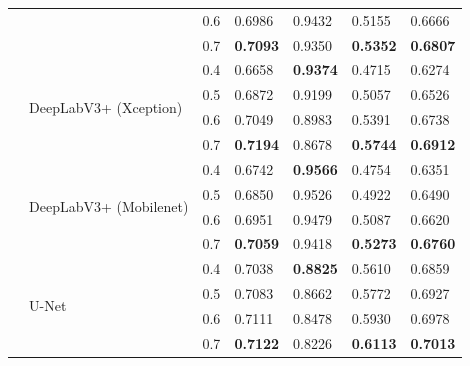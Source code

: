 \documentclass[journal]{IEEEtran}
\begin{document}
\begin{table}[t]
\begin{tabular}{p{1.5cm}p{3.5cm}p{1cm}p{1cm}p{1cm}p{1cm}p{1cm}}
        &                                               & 0.6      & 0.6986           & 0.9432          & 0.5155          & 0.6666             \\
        &                                               & 0.7      & \textbf{0.7093}  & 0.9350          & \textbf{0.5352} & \textbf{0.6807}    \\
        \cmidrule{2-7}
        & \multirow{4}{3.5cm}{DeepLabV3+ (Xception)}    & 0.4      & 0.6658           & \textbf{0.9374} & 0.4715          & 0.6274             \\
        &                                               & 0.5      & 0.6872           & 0.9199          & 0.5057          & 0.6526             \\
        &                                               & 0.6      & 0.7049           & 0.8983          & 0.5391          & 0.6738             \\
        &                                               & 0.7      & \textbf{0.7194}  & 0.8678          & \textbf{0.5744} & \textbf{0.6912}    \\
        \cmidrule{2-7}
        & \multirow{4}{3.5cm}{DeepLabV3+ (Mobilenet)}   & 0.4      & 0.6742           & \textbf{0.9566} & 0.4754          & 0.6351             \\
        &                                               & 0.5      & 0.6850           & 0.9526          & 0.4922          & 0.6490             \\
        &                                               & 0.6      & 0.6951           & 0.9479          & 0.5087          & 0.6620             \\
        &                                               & 0.7      & \textbf{0.7059}  & 0.9418          & \textbf{0.5273} & \textbf{0.6760}    \\
        \cmidrule{2-7}
        & \multirow{4}{3.5cm}{U-Net}                    & 0.4      & 0.7038           & \textbf{0.8825} & 0.5610          & 0.6859             \\
        &                                               & 0.5      & 0.7083           & 0.8662          & 0.5772          & 0.6927             \\
        &                                               & 0.6      & 0.7111           & 0.8478          & 0.5930          & 0.6978             \\
        &                                               & 0.7      & \textbf{0.7122}  & 0.8226          & \textbf{0.6113} & \textbf{0.7013}    \\

\end{tabular}
\end{table}
\end{document}
